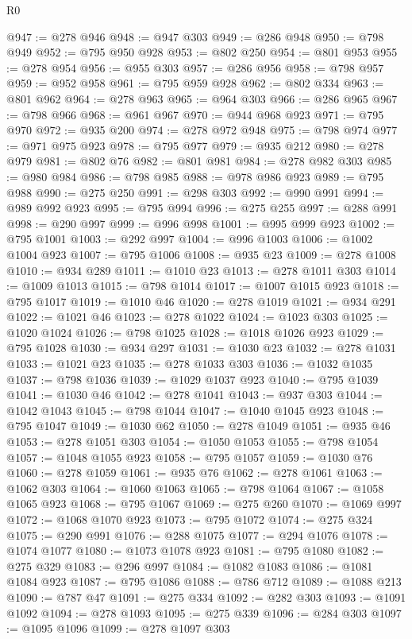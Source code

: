 \begin{lexlean}{R0}
\begin{coremodule}
@947 := @278 @946
@948 := @947 @303
@949 := @286 @948
@950 := @798 @949
@952 := @795 @950 @928
@953 := @802 @250
@954 := @801 @953
@955 := @278 @954
@956 := @955 @303
@957 := @286 @956
@958 := @798 @957
@959 := @952 @958
@961 := @795 @959 @928
@962 := @802 @334
@963 := @801 @962
@964 := @278 @963
@965 := @964 @303
@966 := @286 @965
@967 := @798 @966
@968 := @961 @967
@970 := @944 @968 @923
@971 := @795 @970
@972 := @935 @200
@974 := @278 @972 @948
@975 := @798 @974
@977 := @971 @975 @923
@978 := @795 @977
@979 := @935 @212
@980 := @278 @979
@981 := @802 @76
@982 := @801 @981
@984 := @278 @982 @303
@985 := @980 @984
@986 := @798 @985
@988 := @978 @986 @923
@989 := @795 @988
@990 := @275 @250
@991 := @298 @303
@992 := @990 @991
@994 := @989 @992 @923
@995 := @795 @994
@996 := @275 @255
@997 := @288 @991
@998 := @290 @997
@999 := @996 @998
@1001 := @995 @999 @923
@1002 := @795 @1001
@1003 := @292 @997
@1004 := @996 @1003
@1006 := @1002 @1004 @923
@1007 := @795 @1006
@1008 := @935 @23
@1009 := @278 @1008
@1010 := @934 @289
@1011 := @1010 @23
@1013 := @278 @1011 @303
@1014 := @1009 @1013
@1015 := @798 @1014
@1017 := @1007 @1015 @923
@1018 := @795 @1017
@1019 := @1010 @46
@1020 := @278 @1019
@1021 := @934 @291
@1022 := @1021 @46
@1023 := @278 @1022
@1024 := @1023 @303
@1025 := @1020 @1024
@1026 := @798 @1025
@1028 := @1018 @1026 @923
@1029 := @795 @1028
@1030 := @934 @297
@1031 := @1030 @23
@1032 := @278 @1031
@1033 := @1021 @23
@1035 := @278 @1033 @303
@1036 := @1032 @1035
@1037 := @798 @1036
@1039 := @1029 @1037 @923
@1040 := @795 @1039
@1041 := @1030 @46
@1042 := @278 @1041
@1043 := @937 @303
@1044 := @1042 @1043
@1045 := @798 @1044
@1047 := @1040 @1045 @923
@1048 := @795 @1047
@1049 := @1030 @62
@1050 := @278 @1049
@1051 := @935 @46
@1053 := @278 @1051 @303
@1054 := @1050 @1053
@1055 := @798 @1054
@1057 := @1048 @1055 @923
@1058 := @795 @1057
@1059 := @1030 @76
@1060 := @278 @1059
@1061 := @935 @76
@1062 := @278 @1061
@1063 := @1062 @303
@1064 := @1060 @1063
@1065 := @798 @1064
@1067 := @1058 @1065 @923
@1068 := @795 @1067
@1069 := @275 @260
@1070 := @1069 @997
@1072 := @1068 @1070 @923
@1073 := @795 @1072
@1074 := @275 @324
@1075 := @290 @991
@1076 := @288 @1075
@1077 := @294 @1076
@1078 := @1074 @1077
@1080 := @1073 @1078 @923
@1081 := @795 @1080
@1082 := @275 @329
@1083 := @296 @997
@1084 := @1082 @1083
@1086 := @1081 @1084 @923
@1087 := @795 @1086
@1088 := @786 @712
@1089 := @1088 @213
@1090 := @787 @47
@1091 := @275 @334
@1092 := @282 @303
@1093 := @1091 @1092
@1094 := @278 @1093
@1095 := @275 @339
@1096 := @284 @303
@1097 := @1095 @1096
@1099 := @278 @1097 @303

\end{coremodule}
\end{lexlean}
